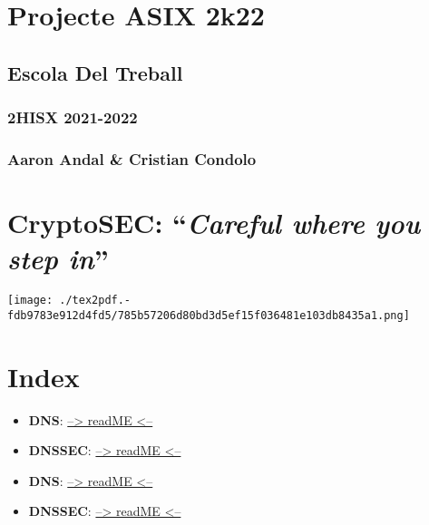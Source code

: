 \documentclass[]{article}
\date{}
\begin{document}
\hypertarget{projecte-asix-2k22}{%
\section{\texorpdfstring{\textbf{Projecte ASIX
2k22}}{Projecte ASIX 2k22}}\label{projecte-asix-2k22}}

\hypertarget{escola-del-treball}{%
\subsection{\texorpdfstring{\textbf{Escola Del
Treball}}{Escola Del Treball}}\label{escola-del-treball}}

\hypertarget{hisx-2021-2022}{%
\subsubsection{\texorpdfstring{\textbf{2HISX
2021-2022}}{2HISX 2021-2022}}\label{hisx-2021-2022}}

\hypertarget{aaron-andal-cristian-condolo}{%
\subsubsection{\texorpdfstring{\textbf{Aaron Andal \& Cristian
Condolo}}{Aaron Andal \& Cristian Condolo}}\label{aaron-andal-cristian-condolo}}

\hypertarget{cryptosec-careful-where-you-step-in}{%
\section{\texorpdfstring{\textbf{CryptoSEC}: ``\emph{Careful where you
step
in}''}{CryptoSEC: ``Careful where you step in''}}\label{cryptosec-careful-where-you-step-in}}

\texttt{[image: ./tex2pdf.-fdb9783e912d4fd5/785b57206d80bd3d5ef15f036481e103db8435a1.png]}

\hypertarget{index}{%
\section{\texorpdfstring{\textbf{Index}}{Index}}\label{index}}

\begin{itemize}
\item
  \textbf{DNS}: \href{}{--\textgreater{} readME \textless{}--}
\item
  \textbf{DNSSEC}: \href{}{--\textgreater{} readME \textless{}--}
\item
  \textbf{DNS}: \href{}{--\textgreater{} readME \textless{}--}
\item
  \textbf{DNSSEC}: \href{}{--\textgreater{} readME \textless{}--}
\end{itemize}
\end{document}

